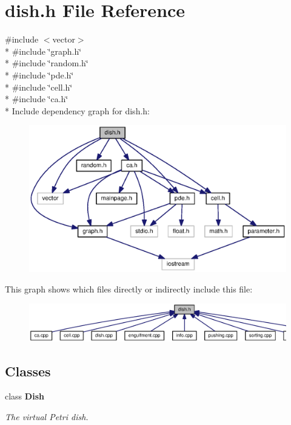\section{dish.\-h File Reference}
\label{dish_8h}
{\ttfamily \#include $<$vector$>$}\\*
{\ttfamily \#include \char`\"{}graph.\-h\char`\"{}}\\*
{\ttfamily \#include \char`\"{}random.\-h\char`\"{}}\\*
{\ttfamily \#include \char`\"{}pde.\-h\char`\"{}}\\*
{\ttfamily \#include \char`\"{}cell.\-h\char`\"{}}\\*
{\ttfamily \#include \char`\"{}ca.\-h\char`\"{}}\\*
Include dependency graph for dish.\-h\-:
\nopagebreak
\begin{figure}[H]
\begin{center}
\leavevmode
\includegraphics[width=350pt]{dish_8h__incl}
\end{center}
\end{figure}
This graph shows which files directly or indirectly include this file\-:
\nopagebreak
\begin{figure}[H]
\begin{center}
\leavevmode
\includegraphics[width=350pt]{dish_8h__dep__incl}
\end{center}
\end{figure}
\subsection*{Classes}
\begin{DoxyCompactItemize}
\item 
class {\bf Dish}
\begin{DoxyCompactList}\small\item\em The virtual Petri dish. \end{DoxyCompactList}\end{DoxyCompactItemize}
